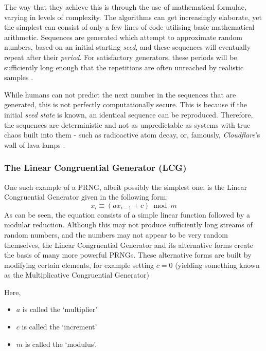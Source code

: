 \documentclass[11pt,a4paper]{article}
\newcommand{\LCGenerator}{x_{i} \equiv(ax_{i-1} + c)\bmod m}
\begin{document}
        The way that they achieve this is through the use of mathematical formulae, varying in levels of complexity. The algorithms can get increasingly elaborate, yet the simplest can consist of only a few lines of code utilising basic mathematical arithmetic.
        Sequences are generated which attempt to approximate random numbers, based on an initial starting \textit{seed}, and these sequences will eventually repeat after their \textit{period}.
        For satisfactory generators, these periods will be sufficiently long enough that the repetitions are often unreached by realistic samples \citep{Gentle03}.

        While humans can not predict the next number in the sequences that are generated, this is not perfectly computationally secure. This is because if the initial \textit{seed state} is known, an identical sequence can be reproduced.
        Therefore, the sequences are deterministic and not as unpredictable as systems with true chaos built into them - such as radioactive atom decay, or, famously, \textit{Cloudflare}'s wall of lava lamps \citep{CloudflareLF17}.


        \subsubsection{The Linear Congruential Generator (LCG)}
            One such example of a PRNG, albeit possibly the simplest one, is the Linear Congruential Generator given in the following form:
                \[
                    \LCGenerator
                \]
            As can be seen, the equation consists of a simple linear function followed by a modular reduction.
            Although this may not produce sufficiently long streams of random numbers, and the numbers may not appear to be very random themselves, the Linear Congruential Generator and its alternative forms create the basis of many more powerful PRNGs.
            These alternative forms are built by modifying certain elements, for example setting $c = 0$ (yielding something known as the Multiplicative Congruential Generator)

            Here,
            \begin{itemize}
                \item $a$ is called the `multiplier'
                \item $c$ is called the `increment'
                \item $m$ is called the `modulus'.
            \end{itemize}
\end{document}
